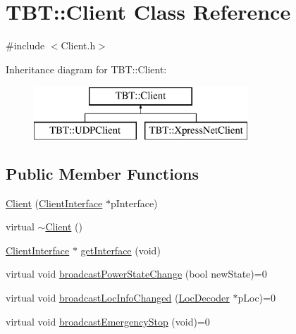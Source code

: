 \hypertarget{classTBT_1_1Client}{}\section{T\+BT\+:\+:Client Class Reference}
\label{classTBT_1_1Client}


{\ttfamily \#include $<$Client.\+h$>$}

Inheritance diagram for T\+BT\+:\+:Client\+:\begin{figure}[H]
\begin{center}
\leavevmode
\includegraphics[height=2.000000cm]{classTBT_1_1Client}
\end{center}
\end{figure}
\subsection*{Public Member Functions}
\begin{DoxyCompactItemize}
\item 
\hyperlink{classTBT_1_1Client_a6220a6ee1345c62986aea535e2ae202c_a6220a6ee1345c62986aea535e2ae202c}{Client} (\hyperlink{classTBT_1_1ClientInterface}{Client\+Interface} $\ast$p\+Interface)
\item 
virtual \hyperlink{classTBT_1_1Client_a34eb45b19974601b60d074ef8baf74ad_a34eb45b19974601b60d074ef8baf74ad}{$\sim$\+Client} ()
\item 
\hyperlink{classTBT_1_1ClientInterface}{Client\+Interface} $\ast$ \hyperlink{classTBT_1_1Client_a37d9a9919aa90879dbf46cf95e519259_a37d9a9919aa90879dbf46cf95e519259}{get\+Interface} (void)
\item 
virtual void \hyperlink{classTBT_1_1Client_ad64588b494ec98154ea261ed4f3b3643_ad64588b494ec98154ea261ed4f3b3643}{broadcast\+Power\+State\+Change} (bool new\+State)=0
\item 
virtual void \hyperlink{classTBT_1_1Client_aeb3b63a37edc6b95872df54a57c27a71_aeb3b63a37edc6b95872df54a57c27a71}{broadcast\+Loc\+Info\+Changed} (\hyperlink{classTBT_1_1LocDecoder}{Loc\+Decoder} $\ast$p\+Loc)=0
\item 
virtual void \hyperlink{classTBT_1_1Client_a59459df809a663bcbbb6d31fbfa09402_a59459df809a663bcbbb6d31fbfa09402}{broadcast\+Emergency\+Stop} (void)=0
\end{DoxyCompactItemize}
